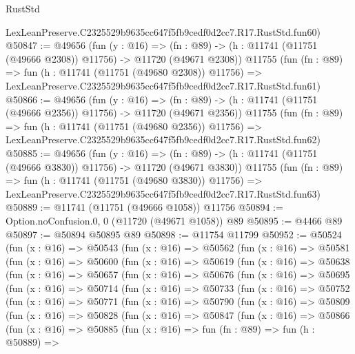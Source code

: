 \begin{lexlean}{RustStd}
\begin{coremodule}
    LexLeanPreserve.C2325529b9635cc647f5fb9cedf0d2cc7.R17.RustStd.fun60)
@50847 := @49656
    (fun (y : @16) =>
    (fn : @89) -> (h : @11741 (@11751 (@49666 @2308)) @11756) -> @11720 (@49671 @2308))
    @11755
    (fun (fn : @89) =>
    fun (h : @11741 (@11751 (@49680 @2308)) @11756) =>
    LexLeanPreserve.C2325529b9635cc647f5fb9cedf0d2cc7.R17.RustStd.fun61)
@50866 := @49656
    (fun (y : @16) =>
    (fn : @89) -> (h : @11741 (@11751 (@49666 @2356)) @11756) -> @11720 (@49671 @2356))
    @11755
    (fun (fn : @89) =>
    fun (h : @11741 (@11751 (@49680 @2356)) @11756) =>
    LexLeanPreserve.C2325529b9635cc647f5fb9cedf0d2cc7.R17.RustStd.fun62)
@50885 := @49656
    (fun (y : @16) =>
    (fn : @89) -> (h : @11741 (@11751 (@49666 @3830)) @11756) -> @11720 (@49671 @3830))
    @11755
    (fun (fn : @89) =>
    fun (h : @11741 (@11751 (@49680 @3830)) @11756) =>
    LexLeanPreserve.C2325529b9635cc647f5fb9cedf0d2cc7.R17.RustStd.fun63)
@50889 := @11741 (@11751 (@49666 @1058)) @11756
@50894 := Option.noConfusion.{0, 0} (@11720 (@49671 @1058)) @89
@50895 := @4466 @89
@50897 := @50894 @50895 @89
@50898 := @11754 @11799
@50952 := @50524
    (fun (x : @16) =>
    @50543
      (fun (x : @16) =>
      @50562
        (fun (x : @16) =>
        @50581
          (fun (x : @16) =>
          @50600
            (fun (x : @16) =>
            @50619
              (fun (x : @16) =>
              @50638
                (fun (x : @16) =>
                @50657
                  (fun (x : @16) =>
                  @50676
                    (fun (x : @16) =>
                    @50695
                      (fun (x : @16) =>
                      @50714
                        (fun (x : @16) =>
                        @50733
                          (fun (x : @16) =>
                          @50752
                            (fun (x : @16) =>
                            @50771
                              (fun (x : @16) =>
                              @50790
                                (fun (x : @16) =>
                                @50809
                                  (fun (x : @16) =>
                                  @50828
                                    (fun (x : @16) =>
                                    @50847
                                      (fun (x : @16) =>
                                      @50866
                                        (fun (x : @16) =>
                                        @50885
                                          (fun (x : @16) =>
                                          fun (fn : @89) =>
                                          fun (h : @50889) =>

\end{coremodule}
\end{lexlean}
